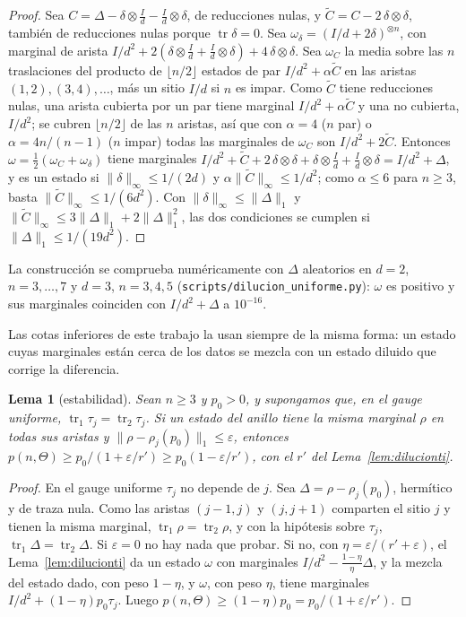 \documentclass[11pt,a4paper]{article}
\newtheorem{lema}[teorema]{Lema}
\theoremstyle{remark}
\newcommand{\tr}{\operatorname{tr}}
\begin{document}
\begin{proof}
Sea $C=\Delta-\delta\otimes\tfrac Id-\tfrac Id\otimes\delta$, de reducciones nulas, y
$\tilde C=C-2\,\delta\otimes\delta$, también de reducciones nulas porque $\tr\delta=0$. Sea
$\omega_\delta=(I/d+2\delta)^{\otimes n}$, con marginal de arista
$I/d^2+2(\delta\otimes\tfrac Id+\tfrac Id\otimes\delta)+4\,\delta\otimes\delta$. Sea $\omega_C$ la media
sobre las $n$ traslaciones del producto de $\lfloor n/2\rfloor$ estados de par
$I/d^2+\alpha\tilde C$ en las aristas $(1,2),(3,4),\dots$, más un sitio $I/d$ si $n$ es impar. Como
$\tilde C$ tiene reducciones nulas, una arista cubierta por un par tiene marginal
$I/d^2+\alpha\tilde C$ y una no cubierta, $I/d^2$; se cubren $\lfloor n/2\rfloor$ de las $n$ aristas,
así que con $\alpha=4$ ($n$ par) o $\alpha=4n/(n-1)$ ($n$ impar) todas las marginales de $\omega_C$
son $I/d^2+2\tilde C$. Entonces $\omega=\tfrac12(\omega_C+\omega_\delta)$ tiene marginales
$I/d^2+\tilde C+2\,\delta\otimes\delta+\delta\otimes\tfrac Id+\tfrac Id\otimes\delta=I/d^2+\Delta$, y
es un estado si $\|\delta\|_\infty\le1/(2d)$ y $\alpha\|\tilde C\|_\infty\le1/d^2$; como
$\alpha\le6$ para $n\ge3$, basta $\|\tilde C\|_\infty\le1/(6d^2)$. Con $\|\delta\|_\infty\le\|\Delta\|_1$
y $\|\tilde C\|_\infty\le3\|\Delta\|_1+2\|\Delta\|_1^2$, las dos condiciones se cumplen si
$\|\Delta\|_1\le1/(19d^2)$.
\end{proof}

La construcción se comprueba numéricamente con $\Delta$ aleatorios en $d=2$, $n=3,\dots,7$ y $d=3$,
$n=3,4,5$ (\texttt{scripts/dilucion\_uniforme.py}): $\omega$ es positivo y sus marginales coinciden
con $I/d^2+\Delta$ a $10^{-16}$.

Las cotas inferiores de este trabajo la usan siempre de la misma forma: un estado cuyas marginales
están cerca de los datos se mezcla con un estado diluido que corrige la diferencia.

\begin{lema}[estabilidad]\label{lem:estabilidad}
Sean $n\ge3$ y $p_0>0$, y supongamos que, en el gauge uniforme, $\tr_1\tau_j=\tr_2\tau_j$. Si un
estado del anillo tiene la misma marginal $\rho$ en todas sus aristas y
$\|\rho-\rho_j(p_0)\|_1\le\varepsilon$, entonces
$p(n,\Theta)\ge p_0/(1+\varepsilon/r')\ge p_0(1-\varepsilon/r')$, con el $r'$ del
Lema~\ref{lem:dilucionti}.
\end{lema}

\begin{proof}
En el gauge uniforme $\tau_j$ no depende de $j$. Sea $\Delta=\rho-\rho_j(p_0)$, hermítico y de traza
nula. Como las aristas $(j{-}1,j)$ y $(j,j{+}1)$ comparten el sitio $j$ y tienen la misma marginal,
$\tr_1\rho=\tr_2\rho$, y con la hipótesis sobre $\tau_j$, $\tr_1\Delta=\tr_2\Delta$. Si
$\varepsilon=0$ no hay nada que probar. Si no, con $\eta=\varepsilon/(r'+\varepsilon)$, el
Lema~\ref{lem:dilucionti} da un estado $\omega$ con marginales $I/d^2-\tfrac{1-\eta}\eta\Delta$, y la
mezcla del estado dado, con peso $1-\eta$, y $\omega$, con peso $\eta$, tiene marginales
$I/d^2+(1-\eta)p_0\tau_j$. Luego $p(n,\Theta)\ge(1-\eta)p_0=p_0/(1+\varepsilon/r')$.
\end{proof}
\end{document}
